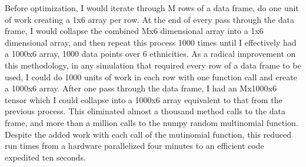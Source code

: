 \par Before optimization, I would iterate through M rows of a data frame, do one unit of work creating a 1x6 array per row.  At the end of every pass through the data frame, I would collapse the combined Mx6 dimensional array into a 1x6 dimensional array, and then repeat this process 1000 times until I effectively had a 1000x6 array, 1000 data points over 6 ethnicities.  As a radical improvement on this methodology, in any simulation that required every row of a data frame to be used, I could do 1000 units of work in each row with one function call and create a 1000x6 array.  After one pass through the data frame, I had an Mx1000x6 tensor which I could collapse into a 1000x6 array equivalent to that from the previous process.  This eliminated almost a thousand method calls to the data frame, and more than a million calls to the numpy random multinomial function.  Despite the added work with each call of the mutinomial function, this reduced run times from a hardware parallelized four minutes to an efficient code expedited ten seconds.
